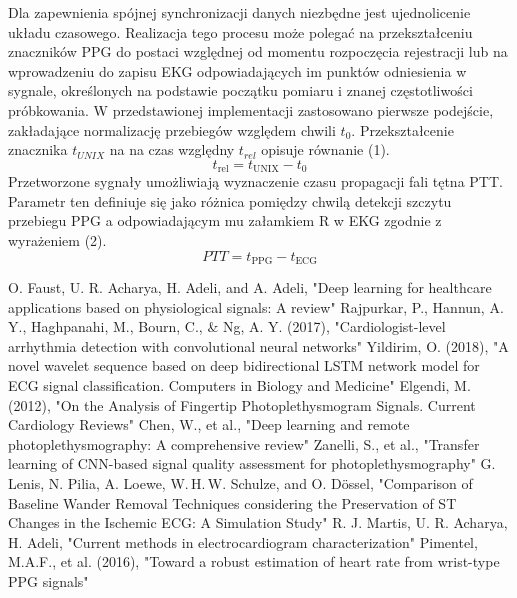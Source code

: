 \documentclass[journal]{IEEEtran}
\begin{document}
Dla zapewnienia spójnej synchronizacji danych niezbędne jest ujednolicenie układu czasowego.
Realizacja tego procesu może polegać na przekształceniu znaczników PPG do postaci względnej od momentu rozpoczęcia rejestracji
lub na wprowadzeniu do zapisu EKG odpowiadających im punktów odniesienia w sygnale, określonych na podstawie początku pomiaru i znanej częstotliwości próbkowania.
W przedstawionej implementacji zastosowano pierwsze podejście, zakładające normalizację przebiegów względem chwili $t_{0}$. Przekształcenie znacznika $t_{UNIX}$ na na czas względny $t_{rel}$ opisuje równanie (1).
\begin{equation}
t_{\mathrm{rel}} = t_{\mathrm{UNIX}} - t_{0}
\end{equation}
Przetworzone sygnały umożliwiają wyznaczenie czasu propagacji fali tętna PTT. Parametr ten definiuje się jako różnica pomiędzy chwilą detekcji szczytu przebiegu PPG a odpowiadającym mu załamkiem R w EKG zgodnie z wyrażeniem (2).
\begin{equation}
PTT = t_{\mathrm{PPG}} - t_{\mathrm{ECG}}
\end{equation}

 
\newpage
\begin{thebibliography}{1}
 O. Faust, U. R. Acharya, H. Adeli, and A. Adeli, "Deep learning for healthcare applications based on physiological signals: A review"
 Rajpurkar, P., Hannun, A. Y., Haghpanahi, M., Bourn, C., \& Ng, A. Y. (2017), "Cardiologist-level arrhythmia detection with convolutional neural networks"
 Yildirim, O. (2018), "A novel wavelet sequence based on deep bidirectional LSTM network model for ECG signal classification. Computers in Biology and Medicine"
 Elgendi, M. (2012), "On the Analysis of Fingertip Photoplethysmogram Signals. Current Cardiology Reviews"
Chen, W., et al., "Deep learning and remote photoplethysmography: A comprehensive review" 
Zanelli, S., et al., "Transfer learning of CNN-based signal quality assessment for photoplethysmography"
 G. Lenis, N. Pilia, A. Loewe, W. H. W. Schulze, and O. Dössel, "Comparison of Baseline Wander Removal Techniques considering the Preservation of ST Changes in the Ischemic ECG: A Simulation Study"
 R. J. Martis, U. R. Acharya, H. Adeli, "Current methods in electrocardiogram characterization"
 Pimentel, M.A.F., et al. (2016), "Toward a robust estimation of heart rate from wrist-type PPG signals"

\end{thebibliography}
\end{document}
